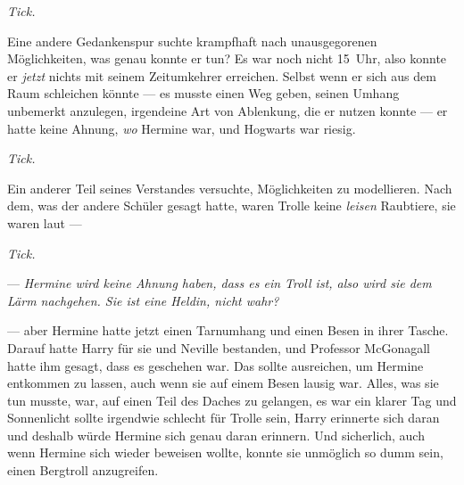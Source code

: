 \emph{Tick.}

Eine andere Gedankenspur suchte krampfhaft nach unausgegorenen Möglichkeiten, was genau konnte er tun? Es war noch nicht 15~Uhr, also konnte er \emph{jetzt} nichts mit seinem Zeitumkehrer erreichen. Selbst wenn er sich aus dem Raum schleichen könnte — es musste einen Weg geben, seinen Umhang unbemerkt anzulegen, irgendeine Art von Ablenkung, die er nutzen konnte — er hatte keine Ahnung, \emph{wo} Hermine war, und Hogwarts war riesig.

\emph{Tick.}

Ein anderer Teil seines Verstandes versuchte, Möglichkeiten zu modellieren. Nach dem, was der andere Schüler gesagt hatte, waren Trolle keine \emph{leisen} Raubtiere, sie waren laut —

\emph{Tick.}


— \emph{Hermine wird keine Ahnung haben, dass es ein Troll ist, also wird sie dem Lärm nachgehen. Sie ist eine Heldin, nicht wahr?}

— aber Hermine hatte jetzt einen Tarnumhang und einen Besen in ihrer Tasche. Darauf hatte Harry für sie und Neville bestanden, und Professor McGonagall hatte ihm gesagt, dass es geschehen war. Das sollte ausreichen, um Hermine entkommen zu lassen, auch wenn sie auf einem Besen lausig war. Alles, was sie tun musste, war, auf einen Teil des Daches zu gelangen, es war ein klarer Tag und Sonnenlicht sollte irgendwie schlecht für Trolle sein, Harry erinnerte sich daran und deshalb würde Hermine sich genau daran erinnern. Und sicherlich, auch wenn Hermine sich wieder beweisen wollte, konnte sie unmöglich so dumm sein, einen Bergtroll anzugreifen.

